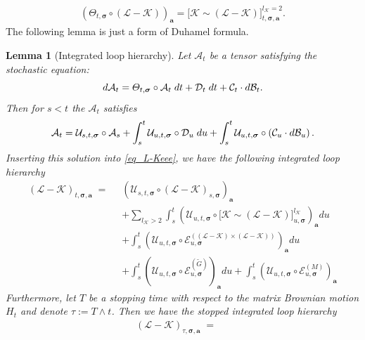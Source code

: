 \documentclass[10pt,reqno]{article}
\theoremstyle{plain} %
\newtheorem{lemma}[theorem]{Lemma}
\theoremstyle{remark}
\numberwithin{equation}{section}
\begin{document}
\begin{align}
    \left({\varTheta}_{t, \boldsymbol{\sigma}} \circ (\mathcal{L} - \mathcal{K})\right)_{\textbf{a}} = \Big[\mathcal{K} \sim (\mathcal{L} - \mathcal{K})\Big]^{l_\mathcal{K} = 2}_{t, \boldsymbol{\sigma}, \textbf{a}}.
\end{align}
 The following lemma is just a form of  Duhamel formula. 

\begin{lemma}[Integrated loop hierarchy] 
    \label{Sol_CalL}
Let $\mathcal{A}_t$ be a tensor satisfying the stochastic equation:
$$
    d \mathcal{A}_t = {\varTheta}_{t, \boldsymbol{\sigma}} \circ \mathcal{A}_t \; dt + \mathcal{D}_t \; dt + \mathcal{C}_t \cdot d{\cal B}_t.
$$
Then for $s<t$ the $\mathcal{A}_t$ satisfies
 $$
    \mathcal{A}_t = \mathcal{U}_{s, t, \boldsymbol{\sigma}} \circ \mathcal{A}_s +
    \int_{s}^t \mathcal{U}_{u, t, \boldsymbol{\sigma}} \circ \mathcal{D}_u \; du +
    \int_{s}^t \mathcal{U}_{u, t, \boldsymbol{\sigma}} \circ 
    \left(\mathcal{C}_u \cdot d{\cal B}_u\right). 
$$
Inserting this solution into \eqref{eq_L-Keee}, we have the following integrated loop hierarchy  
\begin{align}\label{int_K-LcalE}
    (\mathcal{L} - \mathcal{K})_{t, \boldsymbol{\sigma}, \textbf{a}} \;=\; \; &
    \left(\mathcal{U}_{s, t, \boldsymbol{\sigma}} \circ (\mathcal{L} - \mathcal{K})_{s, \boldsymbol{\sigma}}\right)_{\textbf{a}} \nonumber \\
    &+ \sum_{l_\mathcal{K} > 2} \int_{s}^t \left(\mathcal{U}_{u, t, \boldsymbol{\sigma}} \circ \Big[\mathcal{K} \sim (\mathcal{L} - \mathcal{K})\Big]^{l_\mathcal{K}}_{u, \boldsymbol{\sigma}}\right)_{\textbf{a}} du \nonumber \\
    &+ \int_{s}^t \left(\mathcal{U}_{u, t, \boldsymbol{\sigma}} \circ \mathcal{E}^{((\mathcal{L} - \mathcal{K}) \times (\mathcal{L} - \mathcal{K}))}_{u, \boldsymbol{\sigma}}\right)_{\textbf{a}} du  \nonumber \\
    &+ \int_{s}^t \left(\mathcal{U}_{u, t, \boldsymbol{\sigma}} \circ \mathcal{E}^{(\widetilde{G})}_{u, \boldsymbol{\sigma}}\right)_{\textbf{a}} du + \int_{s}^t \left(\mathcal{U}_{u, t, \boldsymbol{\sigma}} \circ \mathcal{E}^{(M)}_{u, \boldsymbol{\sigma}}\right)_{\textbf{a}}  
\end{align}
Furthermore, let $T$ be a stopping time with respect to the matrix Brownian motion $H_t$ and denote  $\tau:= T\wedge t$. 
Then we have the stopped integrated loop hierarchy  
\begin{align}\label{int_K-L_ST}
   (\mathcal{L} - \mathcal{K})_{\tau , \boldsymbol{\sigma}, \textbf{a}} \;=\; \; &

\end{align}
\end{lemma}
\end{document}
